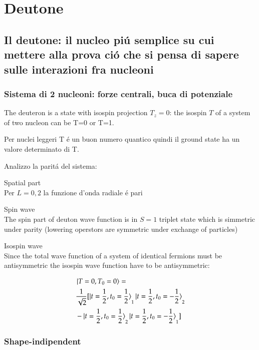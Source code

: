\documentclass[main.tex]{subfiles}
\begin{document}
 \chapter{Deutone}
 
\section[Sistema legato di 2 nucleone: deuteron]{Il deutone: il nucleo pi\'u semplice su cui mettere alla prova ci\'o che si pensa di sapere sulle interazioni  fra nucleoni}

\subsection{Sistema di 2 nucleoni: forze centrali, buca di potenziale}

The deuteron is a state with isospin projection $T_z=0$: the isospin $T$ of a system of two nucleon can be T=0 or T=1.

Per nuclei leggeri T \'e un buon numero quantico quindi  il ground state ha un valore determinato di T.

Analizzo la parit\'a del sistema:
\begin{itemize*}
\item Spatial part\\
Per $L=0,2$ la funzione d'onda radiale \'e pari
\item Spin wave\\
The spin part of deuton wave function is in $S=1$ triplet state which is simmetric under parity (lowering operstors are symmetric under exchange of particles) 
\item Isospin wave\\
Since the total wave function of a system of identical fermions must be antisymmetric the isospin wave function have to be antisymmetric:

\begin{align*}
&\ket{T=0,T_0=0}=\\
&\frac{1}{\sqrt{2}}[\ket{t=\frac{1}{2},t_0=\frac{1}{2}}_1\ket{t=\frac{1}{2},t_0=-\frac{1}{2}}_2\\
&-\ket{t=\frac{1}{2},t_0=\frac{1}{2}}_2\ket{t=\frac{1}{2},t_0=-\frac{1}{2}}_1]
\end{align*}

\end{itemize*}

\subsection{Shape-indipendent}
\end{document}
